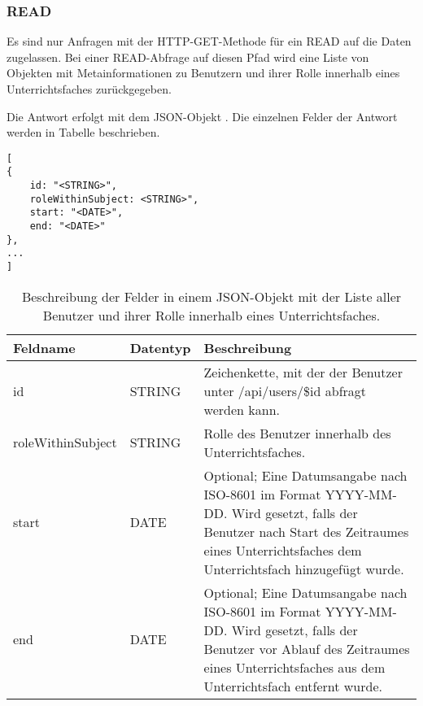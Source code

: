 \subsubsection{READ}
\label{secrest:api:subjects:id:users:read}
Es sind nur Anfragen mit der HTTP-GET-Methode für ein READ auf die Daten zugelassen.
Bei einer READ-Abfrage auf diesen Pfad wird eine Liste von Objekten mit Metainformationen zu Benutzern und ihrer Rolle innerhalb eines Unterrichtsfaches zurückgegeben.

Die Antwort erfolgt mit dem JSON-Objekt . 
Die einzelnen Felder der Antwort werden in Tabelle  beschrieben.

\begin{lstlisting}[caption={JSON-Antwort für einen GET-Aufruf des Pfads /api/subjects/\$id/users},label={lst:code:rest:api:subjects:id:users:read:ret},frame=tlrb]
[
{
    id: "<STRING>",
    roleWithinSubject: <STRING>",
    start: "<DATE>",
    end: "<DATE>"    
},
...
]
\end{lstlisting}
\begin{longtable}{|p{}|p{}|p{}|}
		\caption{Beschreibung der Felder in einem JSON-Objekt mit der Liste aller Benutzer und ihrer Rolle innerhalb eines Unterrichtsfaches.}
\endfoot
		\caption{Beschreibung der Felder in einem JSON-Objekt mit der Liste aller Benutzer und ihrer Rolle innerhalb eines Unterrichtsfaches.}
		\label{tab:rest:api:subjects:id:users:read:ret:json}
\endlastfoot 
\hline
			\textbf{Feldname} & \textbf{Datentyp} & \textbf{Beschreibung} \\ \hline
\endhead
id & STRING & Zeichenkette, mit der der Benutzer unter /api/users/\$id abfragt werden kann. \\ \hline
roleWithinSubject & STRING & Rolle des Benutzer innerhalb des Unterrichtsfaches. \\ \hline
start & DATE & Optional; Eine Datumsangabe nach ISO-8601 im Format YYYY-MM-DD. Wird gesetzt, falls der Benutzer nach Start des Zeitraumes eines Unterrichtsfaches dem Unterrichtsfach hinzugefügt wurde. \\ \hline
end & DATE & Optional; Eine Datumsangabe nach ISO-8601 im Format YYYY-MM-DD. Wird gesetzt, falls der Benutzer vor Ablauf des Zeitraumes eines Unterrichtsfaches aus dem Unterrichtsfach entfernt wurde. \\ \hline
\end{longtable}
